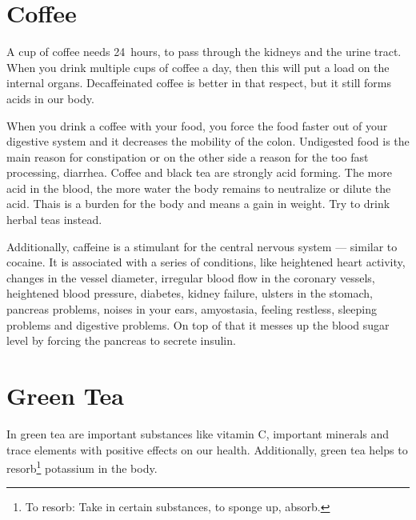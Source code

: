 \documentclass[../main.tex]{subfiles}
\begin{document}
\label{SpecialFoods} %

\section{Coffee}

A cup of coffee needs \SI{24}{hours}, to pass through the kidneys and the urine tract.
When you drink multiple cups of coffee a day, then this will put a load on the internal organs.
Decaffeinated coffee is better in that respect, but it still forms acids in our body.

When you drink a coffee with your food, you force the food faster out of your digestive system
and it decreases the mobility of the colon. Undigested food is the main reason for constipation or on the other side a reason for the too fast processing, diarrhea.
Coffee and black tea are strongly acid forming.
The more acid in the blood, the more water the body remains to neutralize or dilute the acid.
Thais is a burden for the body and means a gain in weight.
Try to drink herbal teas instead.

Additionally, caffeine is a stimulant for the central nervous system --- similar to cocaine.
It is associated with a series of conditions, like heightened heart activity,
changes in the vessel diameter,
irregular blood flow in the coronary vessels,
heightened blood pressure,
diabetes,
kidney failure,
ulsters in the stomach,
pancreas problems,
noises in your ears,
amyostasia,
feeling restless,
sleeping problems and
digestive problems.
On top of that it messes up the blood sugar level by forcing the pancreas to secrete insulin.

\section{Green Tea}

In green tea are important substances like vitamin C, important minerals and trace elements with positive effects on our health.
Additionally, green tea helps to resorb\footnote{To resorb: Take in certain substances, to sponge up, absorb.} potassium in the body.
\end{document}

